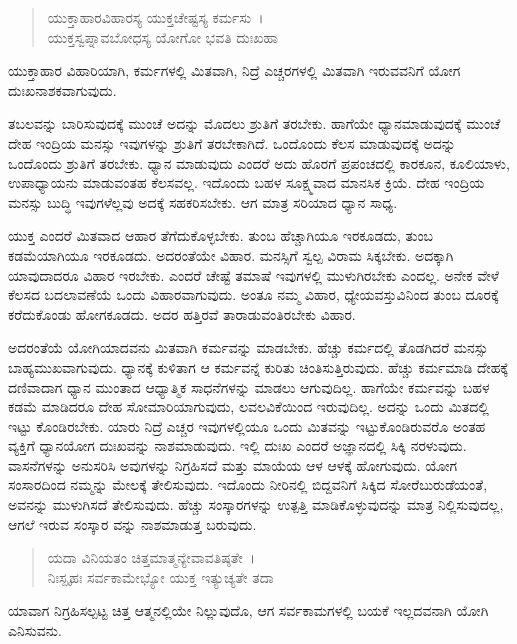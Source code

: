 \begin{verse}
ಯುಕ್ತಾಹಾರವಿಹಾರಸ್ಯ ಯುಕ್ತಚೇಷ್ಟಸ್ಯ ಕರ್ಮಸು~।\\ಯುಕ್ತಸ್ವಪ್ನಾವಬೋಧಸ್ಯ ಯೋಗೋ ಭವತಿ ದುಃಖಹಾ 
\end{verse}

{\small ಯುಕ್ತಾಹಾರ ವಿಹಾರಿಯಾಗಿ, ಕರ್ಮಗಳಲ್ಲಿ ಮಿತವಾಗಿ, ನಿದ್ರೆ ಎಚ್ಚರಗಳಲ್ಲಿ ಮಿತವಾಗಿ ಇರುವವನಿಗೆ ಯೋಗ ದುಃಖನಾಶಕವಾಗುವುದು.}

ತಬಲವನ್ನು ಬಾರಿಸುವುದಕ್ಕೆ ಮುಂಚೆ ಅದನ್ನು ಮೊದಲು ಶ್ರುತಿಗೆ ತರಬೇಕು. ಹಾಗೆಯೇ ಧ್ಯಾನಮಾಡುವುದಕ್ಕೆ ಮುಂಚೆ ದೇಹ ಇಂದ್ರಿಯ ಮನಸ್ಸು ಇವುಗಳನ್ನು ಶ್ರುತಿಗೆ ತರಬೇಕಾಗಿದೆ. ಒಂದೊಂದು ಕೆಲಸ ಮಾಡುವುದಕ್ಕೆ ಅದನ್ನು ಒಂದೊಂದು ಶ್ರುತಿಗೆ ತರಬೇಕು. ಧ್ಯಾನ ಮಾಡುವುದು ಎಂದರೆ ಅದು ಹೊರಗೆ ಪ್ರಪಂಚದಲ್ಲಿ ಕಾರಕೂನ, ಕೂಲಿಯಾಳು, ಉಪಾಧ್ಯಾಯನು ಮಾಡುವಂತಹ ಕೆಲಸವಲ್ಲ. ಇದೊಂದು ಬಹಳ ಸೂಕ್ಷ್ಮವಾದ ಮಾನಸಿಕ ಕ್ರಿಯೆ. ದೇಹ ಇಂದ್ರಿಯ ಮನಸ್ಸು ಬುದ್ಧಿ ಇವುಗಳೆಲ್ಲವು ಅದಕ್ಕೆ ಸಹಕರಿಸಬೇಕು. ಆಗ ಮಾತ್ರ ಸರಿಯಾದ ಧ್ಯಾನ ಸಾಧ್ಯ.

ಯುಕ್ತ ಎಂದರೆ ಮಿತವಾದ ಆಹಾರ ತೆಗೆದುಕೊಳ್ಳಬೇಕು. ತುಂಬ ಹೆಚ್ಚಾಗಿಯೂ ಇರಕೂಡದು, ತುಂಬ ಕಡಮೆಯಾಗಿಯೂ ಇರಕೂಡದು. ಅದರಂತೆಯೇ ವಿಹಾರ. ಮನಸ್ಸಿಗೆ ಸ್ವಲ್ಪ ವಿರಾಮ ಸಿಕ್ಕಬೇಕು. ಅದಕ್ಕಾಗಿ ಯಾವುದಾದರೂ ವಿಹಾರ ಇರಬೇಕು. ಎಂದರೆ ಚೇಷ್ಟೆ ತಮಾಷೆ ಇವುಗಳಲ್ಲಿ ಮುಳುಗಿರಬೇಕು ಎಂದಲ್ಲ. ಅನೇಕ ವೇಳೆ ಕೆಲಸದ ಬದಲಾವಣೆಯೆ ಒಂದು ವಿಹಾರವಾಗುವುದು. ಅಂತೂ ನಮ್ಮ ವಿಹಾರ, ಧ್ಯೇಯವಸ್ತುವಿನಿಂದ ತುಂಬ ದೂರಕ್ಕೆ ಕರೆದುಕೊಂಡು ಹೋಗಕೂಡದು. ಅದರ ಹತ್ತಿರವೆ ತಾರಾಡುವಂತಿರಬೇಕು ವಿಹಾರ.

ಅದರಂತೆಯೆ ಯೋಗಿಯಾದವನು ಮಿತವಾಗಿ ಕರ್ಮವನ್ನು ಮಾಡಬೇಕು. ಹೆಚ್ಚು ಕರ್ಮದಲ್ಲಿ ತೊಡಗಿದರೆ ಮನಸ್ಸು ಬಾಹ್ಯಮುಖವಾಗುವುದು. ಧ್ಯಾನಕ್ಕೆ ಕುಳಿತಾಗ ಆ ಕರ್ಮವನ್ನೆ ಕುರಿತು ಚಿಂತಿಸುತ್ತಿರುವುದು. ಹೆಚ್ಚು ಕರ್ಮಮಾಡಿ ದೇಹಕ್ಕೆ ದಣಿವಾದಾಗ ಧ್ಯಾನ ಮುಂತಾದ ಆಧ್ಯಾತ್ಮಿಕ ಸಾಧನೆಗಳನ್ನು ಮಾಡಲು ಆಗುವುದಿಲ್ಲ. ಹಾಗೆಯೇ ಕರ್ಮವನ್ನು ಬಹಳ ಕಡಮೆ ಮಾಡಿದರೂ ದೇಹ ಸೋಮಾರಿಯಾಗುವುದು, ಲವಲವಿಕೆಯಿಂದ ಇರುವುದಿಲ್ಲ. ಅದನ್ನು ಒಂದು ಮಿತದಲ್ಲಿ ಇಟ್ಟು ಕೊಂಡಿರಬೇಕು. ಯಾರು ನಿದ್ರೆ ಎಚ್ಚರ ಇವುಗಳಲ್ಲಿಯೂ ಒಂದು ಮಿತವನ್ನು ಇಟ್ಟುಕೊಂಡಿರುವರೊ ಅಂತಹ ವ್ಯಕ್ತಿಗೆ ಧ್ಯಾನಯೋಗ ದುಃಖವನ್ನು ನಾಶಮಾಡುವುದು. ಇಲ್ಲಿ ದುಃಖ ಎಂದರೆ ಅಜ್ಞಾನದಲ್ಲಿ ಸಿಕ್ಕಿ ನರಳುವುದು. ವಾಸನೆಗಳನ್ನು ಅನುಸರಿಸಿ ಅವುಗಳನ್ನು ನಿಗ್ರಹಿಸದೆ ಮತ್ತು ಮಾಯೆಯ ಆಳ ಆಳಕ್ಕೆ ಹೋಗುವುದು. ಯೋಗ ಸಂಸಾರದಿಂದ ನಮ್ಮನ್ನು ಮೇಲಕ್ಕೆ ತೇಲಿಸುವುದು. ಇದೊಂದು ನೀರಿನಲ್ಲಿ ಬಿದ್ದವನಿಗೆ ಸಿಕ್ಕಿದ ಸೋರೆಬುರುಡೆಯಂತೆ, ಅವನನ್ನು ಮುಳುಗಿಸದೆ ತೇಲಿಸುವುದು. ಹೆಚ್ಚು ಸಂಸ್ಕಾರಗಳನ್ನು ಉತ್ಪತ್ತಿ ಮಾಡಿಕೊಳ್ಳುವುದನ್ನು ಮಾತ್ರ ನಿಲ್ಲಿಸುವುದಲ್ಲ, ಆಗಲೆ ಇರುವ ಸಂಸ್ಕಾರ ವನ್ನು ನಾಶಮಾಡುತ್ತ ಬರುವುದು.

\begin{verse}
ಯದಾ ವಿನಿಯತಂ ಚಿತ್ತಮಾತ್ಮನ್ಯೇವಾವತಿಷ್ಠತೇ~।\\ನಿಃಸ್ಪೃಹಃ ಸರ್ವಕಾಮೇಭ್ಯೋ ಯುಕ್ತ ಇತ್ಯುಚ್ಯತೇ ತದಾ 
\end{verse}

{\small ಯಾವಾಗ ನಿಗ್ರಹಿಸಲ್ಪಟ್ಟ ಚಿತ್ತ ಆತ್ಮನಲ್ಲಿಯೇ ನಿಲ್ಲುವುದೊ, ಆಗ ಸರ್ವಕಾಮಗಳಲ್ಲಿ ಬಯಕೆ ಇಲ್ಲದವನಾಗಿ ಯೋಗಿ ಎನಿಸುವನು.}

